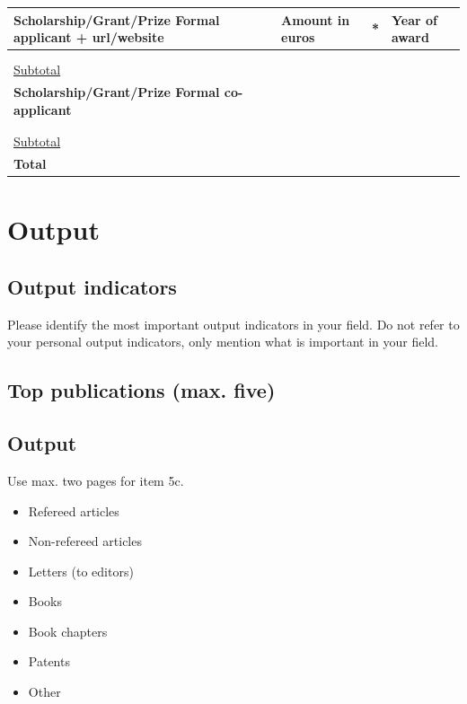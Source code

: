 \documentclass[10pt]{article}
\newcommand{\tableheadfont}{\bfseries\fontsize{10}{10}\selectfont\leavevmode\color{tableblue}}
\begin{document}
	\noindent
	\begin{tabularx}{\linewidth}{|X|X|X|X|}
		\hline
		\tableheadfont Scholarship/Grant/Prize Formal applicant + url/website & \tableheadfont Amount in euros & \tableheadfont * &	\tableheadfont Year of award \\\hline
		& & & \\\hline
		& & & \\\hline
		\textcolor{tableblue}{\underline{Subtotal}} & & & \\\hline
		\tableheadfont Scholarship/Grant/Prize Formal co-
		applicant & & & \\\hline
		& & & \\\hline
		& & & \\\hline
		\textcolor{tableblue}{\underline{Subtotal}} & & & \\\hline
		\tableheadfont Total & & & \\\hline		
	\end{tabularx}
	
	\section{Output}
	
	\subsection{Output indicators}
	
	Please identify the most important output indicators in your field. Do not refer to your personal output indicators, only mention what is important in your field. 
	
	\subsection{Top publications (max. five)}
	\vfill 
	
	\subsection{Output}
	Use max. two pages for item 5c. 
	\begin{itemize}[label={--}]
		\color{tableblue}
		\setlength\itemsep{0em}
		\item Refereed articles
		\item Non-refereed articles
		\item Letters (to editors)
		\item Books
		\item Book chapters
		\item Patents
		\item Other
	\end{itemize}
\end{document}
